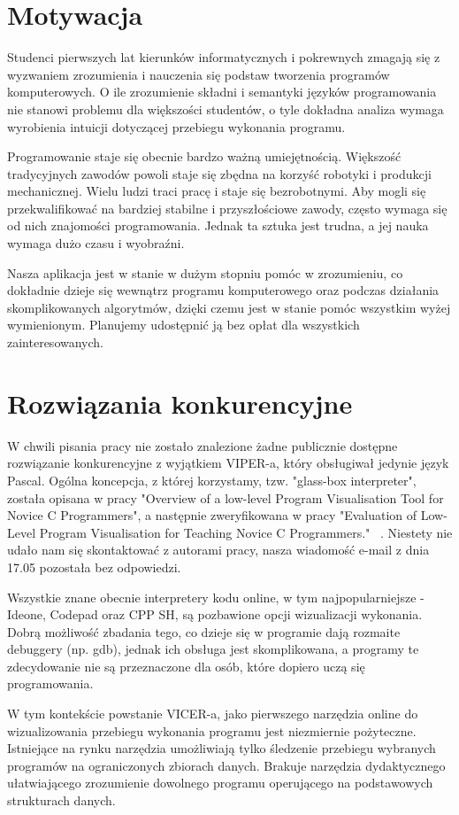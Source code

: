 \documentclass[a4paper,twoside,openright,11pt]{report}
\begin{document}
  \section{Motywacja}
\par Studenci pierwszych lat kierunków informatycznych i pokrewnych zmagają się z wyzwaniem zrozumienia i nauczenia się podstaw tworzenia programów komputerowych. O ile zrozumienie składni i semantyki języków programowania nie stanowi problemu dla większości studentów, o tyle dokładna analiza wymaga wyrobienia intuicji dotyczącej przebiegu wykonania programu.
\par Programowanie staje się obecnie bardzo ważną umiejętnością. Większość tradycyjnych zawodów powoli staje się zbędna na korzyść robotyki i produkcji mechanicznej. Wielu ludzi traci pracę i staje się bezrobotnymi. Aby mogli się przekwalifikować na bardziej stabilne i przyszłościowe zawody, często wymaga się od nich znajomości programowania. Jednak ta sztuka jest trudna, a jej nauka wymaga dużo czasu i wyobraźni. 
\par Nasza aplikacja jest w stanie w dużym stopniu pomóc w zrozumieniu, co dokładnie dzieje się wewnątrz programu komputerowego oraz podczas działania skomplikowanych algorytmów, dzięki czemu jest w stanie pomóc wszystkim wyżej wymienionym. Planujemy udostępnić ją bez opłat dla wszystkich zainteresowanych.

  \section{Rozwiązania konkurencyjne}
\par W chwili pisania pracy nie zostało znalezione żadne publicznie dostępne rozwiązanie konkurencyjne z wyjątkiem VIPER-a, który obsługiwał jedynie język Pascal. Ogólna koncepcja, z której korzystamy, tzw. "glass-box interpreter", została opisana w pracy "Overview of a low-level Program Visualisation Tool for Novice C Programmers"\cite{overview-vistool}, a następnie zweryfikowana w pracy "Evaluation of Low-Level Program Visualisation for Teaching Novice C Programmers." ~\cite{evaluation-vistool}. Niestety nie udało nam się skontaktować z autorami pracy, nasza wiadomość e-mail z dnia 17.05 pozostała bez odpowiedzi.
\par Wszystkie znane obecnie interpretery kodu online, w tym najpopularniejsze - Ideone, Codepad oraz CPP SH, są pozbawione opcji wizualizacji wykonania. Dobrą możliwość zbadania tego, co dzieje się w programie dają rozmaite debuggery (np. gdb), jednak ich obsługa jest skomplikowana, a programy te zdecydowanie nie są przeznaczone dla osób, które dopiero uczą się programowania.
\par W tym kontekście powstanie VICER-a, jako pierwszego narzędzia online do wizualizowania przebiegu wykonania programu jest niezmiernie pożyteczne. Istniejące na rynku narzędzia umożliwiają tylko śledzenie przebiegu wybranych programów na ograniczonych zbiorach danych. Brakuje narzędzia dydaktycznego ułatwiającego zrozumienie dowolnego programu operującego na podstawowych strukturach danych. 
\end{document}
